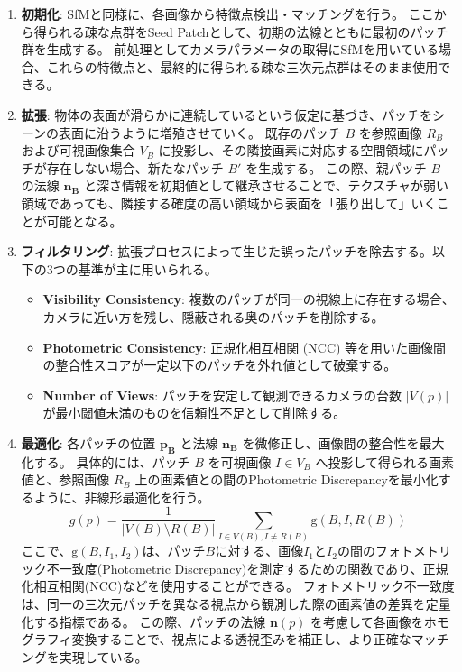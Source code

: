 \begin{enumerate}
    \item \textbf{初期化}:
    SfMと同様に、各画像から特徴点検出・マッチングを行う\cite{Lowe2004_SIFT}。
    ここから得られる疎な点群をSeed Patchとして、初期の法線とともに最初のパッチ群を生成する。
    前処理としてカメラパラメータの取得にSfMを用いている場合、これらの特徴点と、最終的に得られる疎な三次元点群はそのまま使用できる。

    \item \textbf{拡張}:
    物体の表面が滑らかに連続しているという仮定に基づき、パッチをシーンの表面に沿うように増殖させていく。
    既存のパッチ $B$ を参照画像 $R_B$ および可視画像集合 $V_B$ に投影し、その隣接画素に対応する空間領域にパッチが存在しない場合、新たなパッチ $B'$ を生成する。
    この際、親パッチ $B$ の法線 $\mathbf{n_B}$ と深さ情報を初期値として継承させることで、テクスチャが弱い領域であっても、隣接する確度の高い領域から表面を「張り出して」いくことが可能となる。

    \item \textbf{フィルタリング}:
    拡張プロセスによって生じた誤ったパッチを除去する。以下の3つの基準が主に用いられる。
    \begin{itemize}
        \item \textbf{Visibility Consistency}: 複数のパッチが同一の視線上に存在する場合、カメラに近い方を残し、隠蔽される奥のパッチを削除する。
        \item \textbf{Photometric Consistency}: 正規化相互相関 (NCC) 等を用いた画像間の整合性スコアが一定以下のパッチを外れ値として破棄する。
        \item \textbf{Number of Views}: パッチを安定して観測できるカメラの台数 $|V(p)|$ が最小閾値未満のものを信頼性不足として削除する。
    \end{itemize}

    \item \textbf{最適化}:
    各パッチの位置 $\bm{p_B}$ と法線 $\mathbf{n_B}$ を微修正し、画像間の整合性を最大化する。
    具体的には、パッチ $B$ を可視画像 $I \in V_B$ へ投影して得られる画素値と、参照画像 $R_B$ 上の画素値との間のPhotometric Discrepancyを最小化するように、非線形最適化を行う。
    \begin{equation}
      g(p) = \frac{1}{|V(B) \setminus R(B) |} \sum_{I \in V(B), I \neq R(B)} \text{g}(B, I, R(B))
    \end{equation}
    ここで、$\text{g}(B, I_1, I_2)$は、パッチ$B$に対する、画像$I_1$と$I_2$の間のフォトメトリック不一致度(Photometric Discrepancy)を測定するための関数であり、正規化相互相関(NCC)などを使用することができる。
    フォトメトリック不一致度は、同一の三次元パッチを異なる視点から観測した際の画素値の差異を定量化する指標である。
    この際、パッチの法線 $\mathbf{n}(p)$ を考慮して各画像をホモグラフィ変換することで、視点による透視歪みを補正し、より正確なマッチングを実現している。
\end{enumerate}

